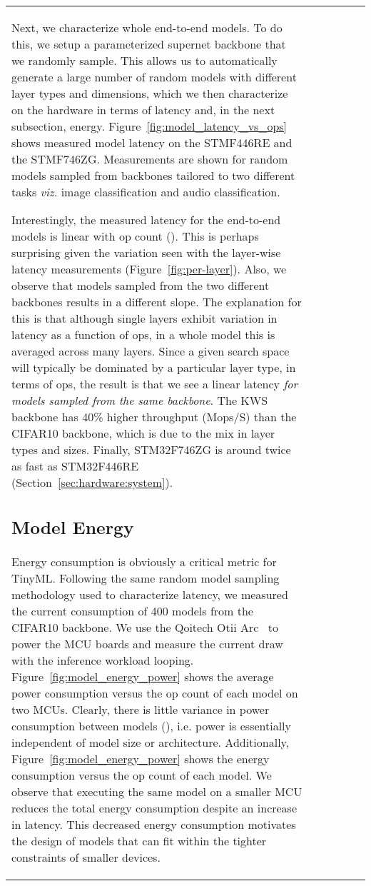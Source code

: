 \documentclass{article}
\begin{document}
\begin{table}[t]
\begin{tabular}{l| c | c | c | c | c}
Next, we characterize whole end-to-end models.
To do this, we setup a parameterized supernet backbone that we randomly sample.
This allows us to automatically generate a large number of random models with different layer types and dimensions, which we then characterize on the hardware in terms of latency and, in the next subsection, energy.
Figure~\ref{fig:model_latency_vs_ops} shows measured model latency on the STMF446RE and the STMF746ZG.
Measurements are shown for random models sampled from backbones tailored to two different tasks \textit{viz.} image classification and audio classification.

Interestingly, the measured latency for the end-to-end models is linear with op count ().
This is perhaps surprising given the variation seen with the layer-wise latency measurements (Figure~\ref{fig:per-layer}).
Also, we observe that models sampled from the two different backbones results in a different slope.
The explanation for this is that although single layers exhibit variation in latency as a function of ops, in a whole model this is averaged across many layers.
Since a given search space will typically be dominated by a particular layer type, in terms of ops, the result is that we see a linear latency \textit{for models sampled from the same backbone}.
The KWS backbone has 40\% higher throughput (Mops/S) than the CIFAR10 backbone, which is due to the mix in layer types and sizes.
Finally, STM32F746ZG is around twice as fast as STM32F446RE (Section~\ref{sec:hardware:system}).








\subsection{Model Energy}
Energy consumption is obviously a critical metric for TinyML.
Following the same random model sampling methodology used to characterize latency, we measured the current consumption of 400 models from the CIFAR10 backbone.
We use the Qoitech Otii Arc~\cite{otii} to power the MCU boards and measure the current draw with the inference workload looping.
Figure~\ref{fig:model_energy_power} shows the average power consumption versus the op count of each model on two MCUs.
Clearly, there is little variance in power consumption between models (), i.e. power is essentially independent of model size or architecture.
Additionally, Figure~\ref{fig:model_energy_power} shows the energy consumption versus the op count of each model. We observe that executing the same model on a smaller MCU reduces the total energy consumption despite an increase in latency. 
This decreased energy consumption motivates the design of models that can fit within the tighter constraints of smaller devices.


\end{tabular}
\end{table}
\end{document}
